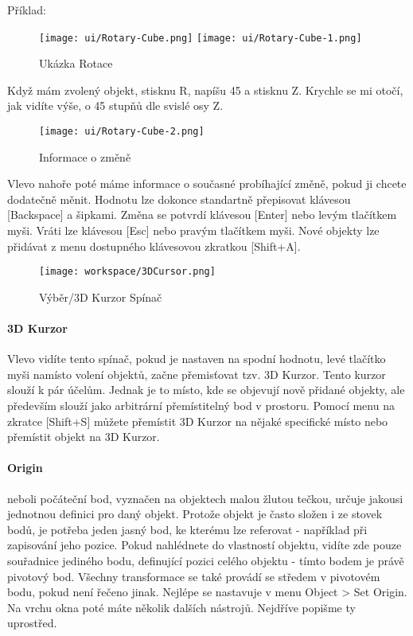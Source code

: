 \documentclass[12pt,a4paper]{report}
\begin{document}
	Příklad:
		\begin{figure}[h]
			\centering
			\texttt{[image: ui/Rotary-Cube.png]}
			\texttt{[image: ui/Rotary-Cube-1.png]}
			\caption{Ukázka Rotace}
			\label{pic:cube-rotation}
		\end{figure}
	
	Když mám zvolený objekt, stisknu R, napíšu 45 a stisknu Z. Krychle se mi
otočí, jak vidíte výše, o 45 stupňů dle svislé osy Z.
	
	\begin{figure}[h]
		\centering
		\texttt{[image: ui/Rotary-Cube-2.png]}
		\caption{Informace o změně}
		\label{pic:cube-rotation-2}
	\end{figure}

	Vlevo nahoře poté máme informace o současné probíhající změně, pokud
	ji chcete dodatečně měnit. Hodnotu lze dokonce standartně přepisovat
	klávesou [Backspace] a šipkami. Změna se potvrdí klávesou [Enter] nebo
	levým tlačítkem myši. Vráti lze klávesou [Esc] nebo pravým tlačítkem
	myši.
	Nové objekty lze přidávat z menu dostupného klávesovou zkratkou
	[Shift+A].
	
	\begin{figure}[h]
		\centering
		\texttt{[image: workspace/3DCursor.png]}
		\caption{Výběr/3D Kurzor Spínač}
		\label{pic:3dcursor}
	\end{figure}

	\paragraph{3D Kurzor} Vlevo vidíte tento spínač, pokud je nastaven na spodní
	hodnotu, levé tlačítko myši namísto volení objektů, začne přemisťovat
	tzv. 3D Kurzor. Tento kurzor slouží k pár účelům. Jednak je to místo, kde
	se objevují nově přidané objekty, ale především slouží jako arbitrární
	přemístitelný bod v prostoru. Pomocí menu na zkratce [Shift+S] můžete
	přemístit 3D Kurzor na nějaké specifické místo nebo přemístit objekt na
	3D Kurzor.
	
	\paragraph{Origin} neboli počáteční bod, vyznačen na objektech malou žlutou
	tečkou, určuje jakousi jednotnou definici pro daný objekt. Protože objekt
	je často složen i ze stovek bodů, je potřeba jeden jasný bod, ke kterému
	lze referovat - například při zapisování jeho pozice. Pokud nahlédnete do
	vlastností objektu, vidíte zde pouze souřadnice jediného bodu, definující
	pozici celého objektu - tímto bodem je právě pivotový bod. Všechny
	transformace se také provádí se středem v pivotovém bodu, pokud není
	řečeno jinak. Nejlépe se nastavuje v menu Object > Set Origin.
	Na vrchu okna poté máte několik dalších nástrojů. Nejdříve popišme ty
	uprostřed.
\end{document}
